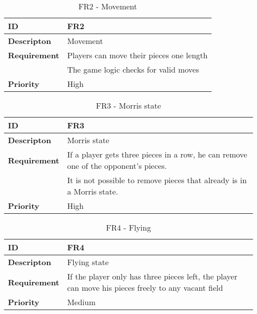 \begin{table}[h!]
\begin{tabular}{ | p{90pt} | p{270pt}  |}
\hline
\bf ID &  FR2  \\ \hline
\bf Descripton & Movement \\ \hline 
\bf Requirement & Players can move their pieces one length  \\
& The game logic checks for valid moves  \\ \hline
\bf Priority & High \\ \hline

\end{tabular}

\caption{FR2 - Movement}

\end{table}


\begin{table}[h!]
\begin{tabular}{ | p{90pt} | p{270pt}  |}
\hline
\bf ID &  FR3  \\ \hline
\bf Descripton & Morris state \\ \hline 
\bf Requirement & If a player gets three pieces in a row, he can remove one of the opponent's pieces.  \\
& It is not possible to remove pieces that already is in a Morris state. \\ \hline
\bf Priority & High \\ \hline

\end{tabular}

\caption{FR3 - Morris state}

\end{table}


\begin{table}[h!]
\begin{tabular}{ | p{90pt} | p{270pt}  |}
\hline
\bf ID &  FR4  \\ \hline
\bf Descripton & Flying state \\ \hline 
\bf Requirement & If the player only has three pieces left, the player can move his pieces freely to any vacant field \\ \hline
\bf Priority & Medium \\ \hline

\end{tabular}

\caption{FR4 - Flying}

\end{table}


